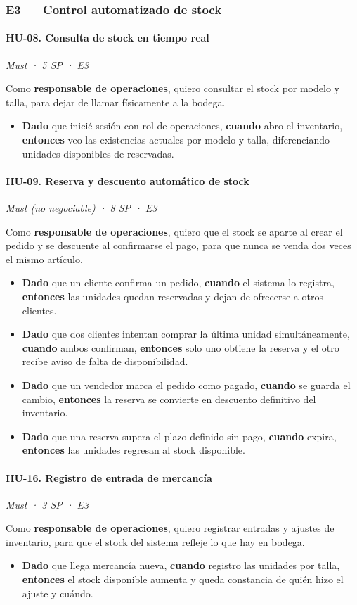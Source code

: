 \documentclass[12pt, a4paper]{article}
\newcommand{\hutag}[3]{\textit{#1 · #2 · #3}\par\vspace{2pt}}
\begin{document}
\subsubsection{E3 --- Control automatizado de stock}

\paragraph{HU-08. Consulta de stock en tiempo real}
\hutag{Must}{5 SP}{E3}
Como \textbf{responsable de operaciones}, quiero consultar el stock por modelo y talla, para dejar de llamar físicamente a la bodega.
\begin{itemize}[leftmargin=*]
    \item \textbf{Dado} que inicié sesión con rol de operaciones, \textbf{cuando} abro el inventario, \textbf{entonces} veo las existencias actuales por modelo y talla, diferenciando unidades disponibles de reservadas.
\end{itemize}

\paragraph{HU-09. Reserva y descuento automático de stock}
\hutag{Must (no negociable)}{8 SP}{E3}
Como \textbf{responsable de operaciones}, quiero que el stock se aparte al crear el pedido y se descuente al confirmarse el pago, para que nunca se venda dos veces el mismo artículo.
\begin{itemize}[leftmargin=*]
    \item \textbf{Dado} que un cliente confirma un pedido, \textbf{cuando} el sistema lo registra, \textbf{entonces} las unidades quedan reservadas y dejan de ofrecerse a otros clientes.
    \item \textbf{Dado} que dos clientes intentan comprar la última unidad simultáneamente, \textbf{cuando} ambos confirman, \textbf{entonces} solo uno obtiene la reserva y el otro recibe aviso de falta de disponibilidad.
    \item \textbf{Dado} que un vendedor marca el pedido como pagado, \textbf{cuando} se guarda el cambio, \textbf{entonces} la reserva se convierte en descuento definitivo del inventario.
    \item \textbf{Dado} que una reserva supera el plazo definido sin pago, \textbf{cuando} expira, \textbf{entonces} las unidades regresan al stock disponible.
\end{itemize}

\paragraph{HU-16. Registro de entrada de mercancía}
\hutag{Must}{3 SP}{E3}
Como \textbf{responsable de operaciones}, quiero registrar entradas y ajustes de inventario, para que el stock del sistema refleje lo que hay en bodega.
\begin{itemize}[leftmargin=*]
    \item \textbf{Dado} que llega mercancía nueva, \textbf{cuando} registro las unidades por talla, \textbf{entonces} el stock disponible aumenta y queda constancia de quién hizo el ajuste y cuándo.
\end{itemize}
\end{document}
